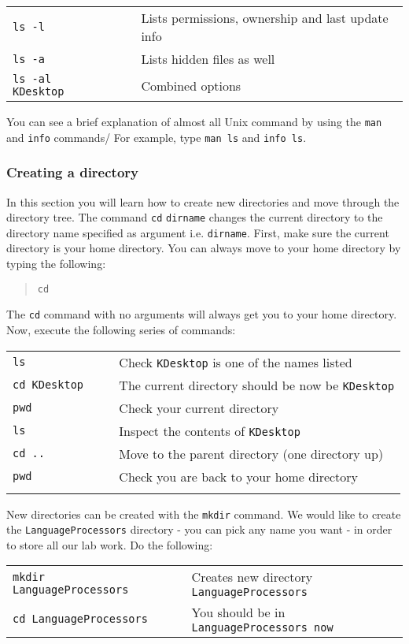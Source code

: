 \documentclass{article}
\newcommand{\fname}[1]{\texttt{#1}}
\begin{document}
\begin{tabular}{lll}
{\tt ls -l} & $\;\;\;$ & Lists permissions, ownership and last update info \\
{\tt ls -a} & & Lists hidden files as well \\
{\tt ls -al KDesktop} & & Combined options
\end{tabular}

You can see a brief explanation of almost all Unix command by using the {\tt man} and {\tt info} commands/ For example, type {\tt man ls} and {\tt info ls}.

\subsubsection*{Creating a directory}

In this section you will learn how to create new directories and move through the directory tree. The command {\tt cd} \fname{dirname} changes the current directory to the directory name specified as argument i.e. \fname{dirname}. 
First, make sure the current directory is your home directory. You can always move to your home directory by typing the following:
\begin{quote}
{\tt cd}
\end{quote}
The {\tt cd} command with no arguments will always get you to your home directory. Now, execute the following series of commands:\\

\begin{tabular}{lll}
{\tt ls} & $\;\;\;$ & Check {\tt KDesktop} is one of the names listed \\
{\tt cd KDesktop} & & The current directory should be now be {\tt KDesktop} \\
{\tt pwd} & & Check your current directory \\
{\tt ls} & & Inspect the contents of {\tt KDesktop} \\
{\tt cd ..} & & Move to the parent directory (one directory up) \\
{\tt pwd} & & Check you are back to your home directory \\
 & &
\end{tabular}

New directories can be created with the {\tt mkdir} command. We would like to create the {\tt LanguageProcessors} directory - you can pick any name you want - in order to store all our lab work. Do the following:

\begin{tabular}{lll}
{\tt mkdir LanguageProcessors} & $\;\;\;$ & Creates new directory {\tt LanguageProcessors} \\
{\tt cd LanguageProcessors} & & You should be in {\tt LanguageProcessors now}
\end{tabular}
\end{document}

